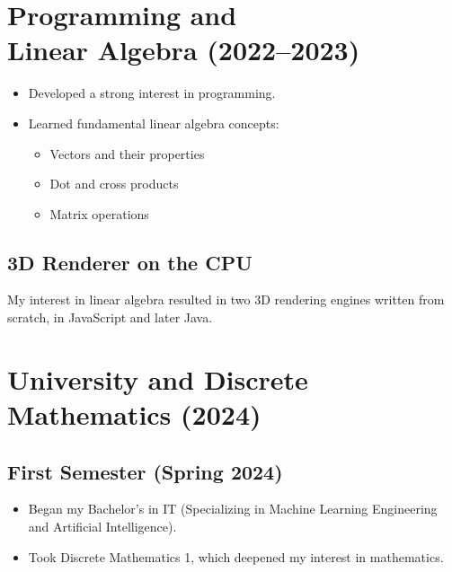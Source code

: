 \documentclass{article}
\begin{document}
\section[Programming and Linear Algebra (2022--2023)]{Programming and \\ Linear Algebra (2022--2023)}
\begin{itemize}
    \item Developed a strong interest in programming.
    \item Learned fundamental linear algebra concepts:
    \begin{itemize}
        \item Vectors and their properties
        \item Dot and cross products
        \item Matrix operations
    \end{itemize}
\end{itemize}
\subsection*{3D Renderer on the CPU}
My interest in linear algebra resulted in two 3D rendering engines written from scratch, in JavaScript and later Java.

\break
\section{University and Discrete Mathematics (2024)}
\subsection{First Semester (Spring 2024)}
\begin{itemize}
    \item Began my Bachelor’s in IT (Specializing in Machine Learning Engineering and Artificial Intelligence).
    \item Took Discrete Mathematics 1, which deepened my interest in mathematics.
\end{itemize}
\end{document}
